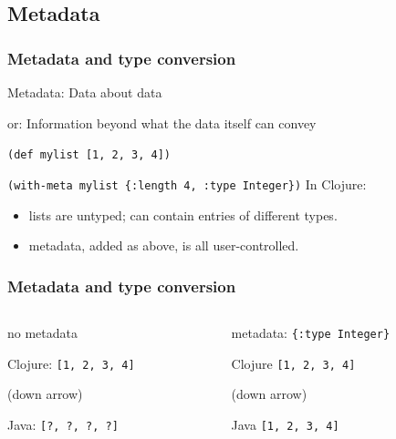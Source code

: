 \documentclass{beamer}
\newcommand{\linespace}{\vskip 0.25cm}
\begin{document}
\subsection{Metadata}

\begin{frame}
  \frametitle{Metadata and type conversion}

	Metadata: Data about data
	
	or: Information beyond what the data itself can convey
	
	{\tt (def mylist [1, 2, 3, 4])}
	
	{\tt (with-meta mylist \{:length 4, :type Integer\})}
	\linespace
	In Clojure:
	\begin{itemize}
	\item lists are untyped; can contain entries of different types.
	\item metadata, added as above, is all user-controlled.
	\end{itemize}
	
	
\end{frame}


\begin{frame}
\frametitle{Metadata and type conversion}
 \begin{columns}
 \begin{column}{0.5\textwidth}
 no metadata
 
 Clojure: {\tt [1, 2, 3, 4]}

 (down arrow)
 
 Java: {\tt [?, ?, ?, ?]}
 
 \end{column}
 
 \begin{column}{0.5\textwidth}
 metadata: {\tt \{:type Integer\}}
 
 Clojure {\tt [1, 2, 3, 4]}
 
 (down arrow)
 
 Java {\tt [1, 2, 3, 4]}
 \end{column}
 \end{columns}
\end{frame}
\end{document}
